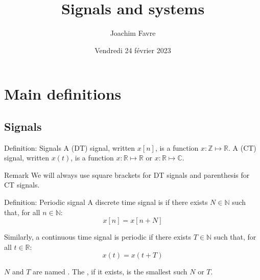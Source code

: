 \documentclass[a4paper]{article}
\title{Signals and systems}
\author{Joachim Favre}
\date{Vendredi 24 février 2023}
\begin{document}
\maketitle


\section{Main definitions}
\subsection{Signals}

\begin{parag}{Definition: Signals}
    A  (DT) signal, written $x\left[n\right]$, is a function $x: \mathbb{Z} \mapsto \mathbb{R}$. A  (CT) signal, written $x\left(t\right)$, is a function $x: \mathbb{R} \mapsto \mathbb{R}$ or $x: \mathbb{R} \mapsto \mathbb{C}$.

    \begin{subparag}{Remark}
        We will always use square brackets for DT signals and parenthesis for CT signals.
    \end{subparag}
\end{parag}

\begin{parag}{Definition: Periodic signal}
    A discrete time signal is  if there exists $N \in \mathbb{N}$ such that, for all $n \in \mathbb{N}$: 
    \[x\left[n\right] = x\left[n + N\right]\]
    
    Similarly, a continuous time signal is periodic if there exists $T \in\mathbb{N}$ such that, for all $t \in \mathbb{R}$: 
    \[x\left(t\right) = x\left(t + T\right)\]
    
    $N$ and $T$ are named . The , if it exists, is the smallest such $N$ or $T$.
\end{parag}
\end{document}
